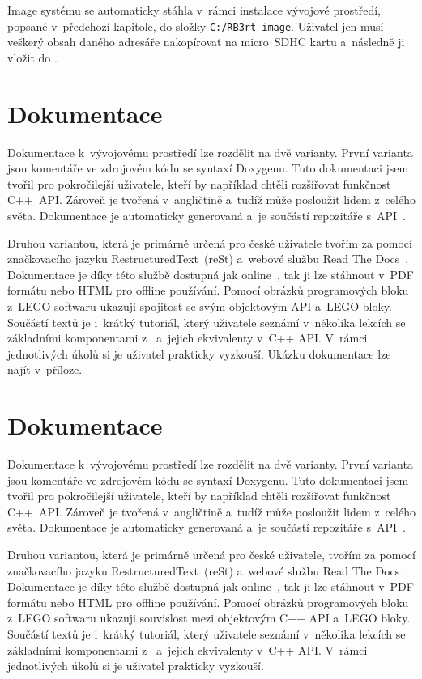 Image systému se automaticky stáhla v~rámci instalace vývojové prostředí, popsané v~předchozí kapitole, do složky \texttt{C:/RB3rt-image}. 
Uživatel jen musí veškerý obsah daného adresáře nakopírovat na micro~SDHC kartu a~následně ji vložit do .


\section{Dokumentace}

Dokumentace k~vývojovému prostředí lze rozdělit na dvě varianty. 
První varianta jsou komentáře ve zdrojovém kódu se syntaxí Doxygenu.
Tuto dokumentaci jsem tvořil pro pokročilejší uživatele, kteří by například chtěli rozšiřovat funkčnost C++~API. 
Zároveň je tvořená v~angličtině a~tudíž může posloužit lidem z~celého světa.
Dokumentace je automaticky generovaná a~je součástí repozitáře s~API~\cite{roboticsbrno-EV3RT-API-Reference}.
     
Druhou variantou, která je primárně určená pro české uživatele tvořím za pomocí značkovacího jazyku RestructuredText~(reSt) a~webové službu Read The Docs~\cite{readthedocs}.
Dokumentace je díky této službě dostupná jak online~\cite{readthedocs-rb3rt}, tak ji lze stáhnout v~PDF formátu nebo HTML pro offline používání.
Pomocí obrázků programových bloku z~LEGO softwaru ukazuji spojitost se svým objektovým API a~LEGO bloky.
Součástí textů je i~krátký tutoriál, který uživatele seznámí v~několika lekcích se základními komponentami z~\legoEV{} a~jejich ekvivalenty v~C++ API. 
V~rámci jednotlivých úkolů si je uživatel prakticky vyzkouší.
Ukázku dokumentace lze najít v~příloze.





\section{Dokumentace}

Dokumentace k~vývojovému prostředí lze rozdělit na dvě varianty. 
První varianta jsou komentáře ve zdrojovém kódu se syntaxí Doxygenu.
Tuto dokumentaci jsem tvořil pro pokročilejší uživatele, kteří by například chtěli rozšiřovat funkčnost C++~API. 
Zároveň je tvořená v~angličtině a~tudíž může posloužit lidem z~celého světa.
Dokumentace je automaticky generovaná a~je součástí repozitáře s~API~\cite{roboticsbrno-EV3RT-API-Reference}.
     
Druhou variantou, která je primárně určená pro české uživatele, tvořím za pomocí značkovacího jazyku RestructuredText~(reSt) a~webové službu Read The Docs~\cite{readthedocs}.
Dokumentace je díky této službě dostupná jak online~\cite{readthedocs-rb3rt}, tak ji lze stáhnout v~PDF formátu nebo HTML pro offline používání.
Pomocí obrázků programových bloku z~LEGO softwaru ukazuji souvislost mezi objektovým C++ API a~LEGO bloky.
Součástí textů je i~krátký tutoriál, který uživatele seznámí v~několika lekcích se základními komponentami z~\legoEV{} a~jejich ekvivalenty v~C++ API. 
V~rámci jednotlivých úkolů si je uživatel prakticky vyzkouší.

